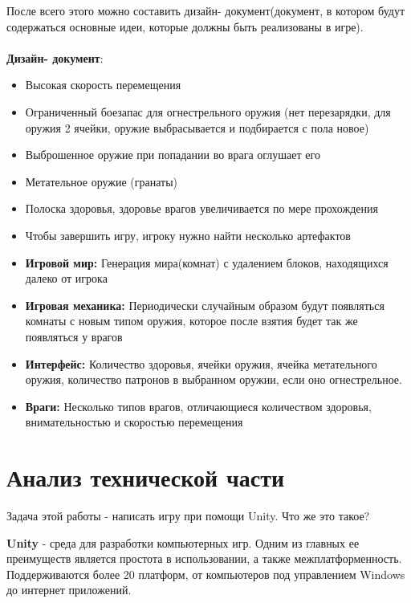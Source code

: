 \documentclass[14pt, titlepage,fleqn,a4paper]{extarticle}
\begin{document}
После всего этого можно составить дизайн- документ(документ, в котором будут содержаться основные идеи, которые должны быть реализованы в игре).
\\
\\
\textbf{Дизайн- документ}:
\begin{itemize}
	\item Высокая скорость перемещения
	\item Ограниченный боезапас для огнестрельного оружия (нет перезарядки, для оружия 2 ячейки, оружие выбрасывается и подбирается с пола новое)
	\item Выброшенное оружие при попадании во врага оглушает его
	\item Метательное оружие (гранаты)
	\item Полоска здоровья, здоровье врагов увеличивается по мере прохождения
    \item Чтобы завершить игру, игроку нужно найти несколько артефактов

	\item \textbf{Игровой мир:}
	Генерация мира(комнат) с удалением блоков, находящихся далеко от игрока 

	\item \textbf{Игровая механика:}
	Периодически случайным образом будут появляться комнаты с новым типом оружия, которое после взятия будет так же появляться у врагов

	\item \textbf{Интерфейс:}
	Количество здоровья, ячейки оружия, ячейка метательного оружия, количество патронов в выбранном оружии, если оно огнестрельное.

	\item \textbf{Враги:}
	Несколько типов врагов, отличающиеся количеством здоровья, внимательностью и скоростью перемещения
\end{itemize}
	\section*{Анализ технической части}

    Задача этой работы - написать игру при помощи Unity. Что же это такое?

\textbf{Unity} - среда для разработки компьютерных игр. Одним из главных ее преимуществ является простота в использовании, а также межплатформенность. Поддерживаются более 20 платформ, от компьютеров под управлением Windows до интернет приложений.
\end{document}
